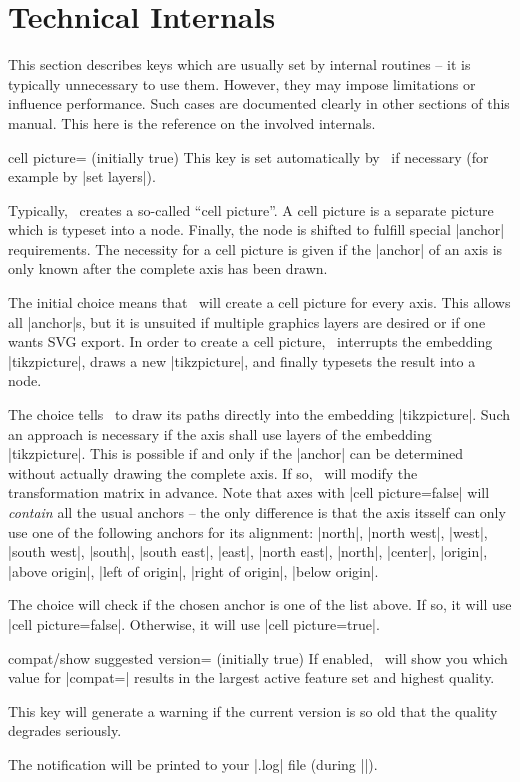 
\section{Technical Internals}
{
%

This section describes keys which are usually set by internal routines -- it is typically unnecessary to use them. However, they may impose limitations or influence performance. Such cases are documented clearly in other sections of this manual. This here is the reference on the involved internals.

\begin{pgfplotskey}{cell picture= (initially true)}
	This key is set automatically by \PGFPlots\ if necessary (for example by |set layers|).

	Typically, \PGFPlots\ creates a so-called ``cell picture''. A cell picture is a separate picture which is typeset into a node. Finally, the node is shifted to fulfill special |anchor| requirements. The necessity for a cell picture is given if the |anchor| of an axis is only known after the complete axis has been drawn.

	The initial choice  means that \PGFPlots\ will create a cell picture for every axis. This allows all |anchor|s, but it is unsuited if multiple graphics layers are desired or if one wants SVG export. In order to create a cell picture, \PGFPlots\ interrupts the embedding |tikzpicture|, draws a new |tikzpicture|, and finally typesets the result into a node.

	The choice  tells \PGFPlots\ to draw its paths directly into the embedding |tikzpicture|. Such an approach is necessary if the axis shall use layers of the embedding |tikzpicture|. This is possible if and only if the |anchor| can be determined without actually drawing the complete axis. If so, \PGFPlots\ will modify the transformation matrix in advance. Note that axes with |cell picture=false| will \emph{contain} all the usual anchors -- the only difference is that the axis itsself can only use one of the following anchors for its alignment: |north|, |north west|, |west|, |south west|, |south|, |south east|, |east|, |north east|, |north|, |center|, |origin|, |above origin|, |left of origin|, |right of origin|, |below origin|.

	The choice  will check if the chosen anchor is one of the list above. If so, it will use |cell picture=false|. Otherwise, it will use |cell picture=true|.

\end{pgfplotskey}

\begin{pgfplotskey}{compat/show suggested version= (initially true)}
	If enabled, \PGFPlots\ will show you which value for |compat=| results in the largest active feature set and highest quality.
	
	This key will generate a warning if the current version is so old that the quality degrades seriously.

	The notification will be printed to your |.log| file (during ||).
\end{pgfplotskey}
}
